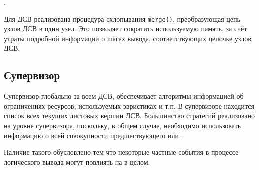 .

Для ДСВ реализована процедура схлопывания {\tt merge()}, преобразующая цепь узлов ДСВ в один узел. Это позволяет сократить используемую память, за счёт утраты подробной информации о шагах вывода, соответствующих цепочке узлов ДСВ.


\subsection{Супервизор}
Супервизор  глобально за всем ДСВ, обеспечивает алгоритмы информацией об ограничениях ресурсов, используемых эвристиках и т.п. В супервизоре находится список всех текущих листовых вершин ДСВ. Большинство стратегий реализовано на уровне супервизора, поскольку, в общем случае, необходимо использовать информацию о всей совокупности предшествующего или .

Наличие такого  обусловлено тем что некоторые частные события в процессе логического вывода могут повлиять на  в целом.


